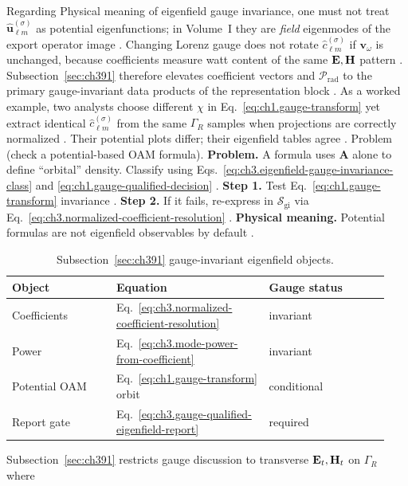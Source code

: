Regarding Physical meaning of eigenfield gauge invariance, one must not treat \(\widehat{\mathbf{u}}_{\ell m}^{(\sigma)}\) as potential eigenfunctions; in Volume~I they are
\emph{field} eigenmodes of the export operator image \cite{hansen1988}. Changing Lorenz gauge does not
rotate \(\widehat{c}_{\ell m}^{(\sigma)}\) if \(\mathbf{v}_\omega\) is unchanged, because coefficients measure watt content of the
same \(\mathbf{E},\mathbf{H}\) pattern \cite{poynting1884}. Subsection~\ref{sec:ch391} therefore elevates coefficient
vectors and \(\mathcal{P}_{\mathrm{rad}}\) to the primary gauge-invariant data products of the representation block
\cite{stratton1941}.
As a worked example, two analysts choose different \(\chi\) in Eq.~\eqref{eq:ch1.gauge-transform} yet extract identical \(\widehat{c}_{\ell m}^{(\sigma)}\)
from the same \(\Gamma_R\) samples when projections are correctly normalized \cite{stratton1941}. Their
potential plots differ; their eigenfield tables agree \cite{belinfante1940}.
Problem (check a potential-based OAM formula). \textbf{Problem.} A formula uses \(\mathbf{A}\) alone to define ``orbital'' density. Classify using
Eqs.~\eqref{eq:ch3.eigenfield-gauge-invariance-class} and \eqref{eq:ch1.gauge-qualified-decision}
\cite{belinfante1940}.
\textbf{Step 1.} Test Eq.~\eqref{eq:ch1.gauge-transform} invariance \cite{stratton1941}.
\textbf{Step 2.} If it fails, re-express in \(\mathcal{S}_{\mathrm{gi}}\) via Eq.~\eqref{eq:ch3.normalized-coefficient-resolution} \cite{hansen1988}.
\textbf{Physical meaning.} Potential formulas are not eigenfield observables by default \cite{belinfante1940}.
\begin{table}[t]
\centering
\caption{Subsection~\ref{sec:ch391} gauge-invariant eigenfield objects.}
\label{tab:ch3.391-gi-objects}
\small
\begin{tabular}{@{}p{0.26\linewidth}p{0.38\linewidth}p{0.30\linewidth}@{}}
\toprule
Object & Equation & Gauge status \\
\midrule
Coefficients & Eq.~\eqref{eq:ch3.normalized-coefficient-resolution} & invariant \\
Power & Eq.~\eqref{eq:ch3.mode-power-from-coefficient} & invariant \\
Potential OAM & Eq.~\eqref{eq:ch1.gauge-transform} orbit & conditional \\
Report gate & Eq.~\eqref{eq:ch3.gauge-qualified-eigenfield-report} & required \\
\bottomrule
\end{tabular}
\end{table}
Subsection~\ref{sec:ch391} restricts gauge discussion to transverse \(\mathbf{E}_{t},\mathbf{H}_{t}\) on \(\Gamma_R\) where
